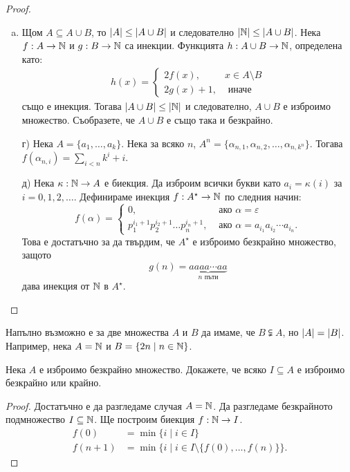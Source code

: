 \begin{proof}
  \begin{enumerate}[a)]
  \item
    Щом $A \subseteq A\cup B$, то $\lvert{A}\rvert \leq \lvert{A\cup B}\rvert$ и следователно
    $\lvert{\mathbb{N}}\rvert \leq \lvert{A\cup B}\rvert$.
    Нека $f:A\to \mathbb{N}$ и $g:B\to\mathbb{N}$ са инекции.
    Функцията $h:A\cup B\to \mathbb{N}$, определена като:
    \begin{align*}
      h(x) = 
      \begin{cases}
        2f(x), & x \in A\setminus B\\
        2g(x) + 1, & \mbox{ иначе}
      \end{cases}
    \end{align*}
    също е инекция.
    Тогава $\lvert{A\cup B}\rvert \leq \lvert{\mathbb{N}}\rvert$ и следователно, 
    $A\cup B$ е изброимо множество. 
    Съобразете, че $A\cup B$ е също така и безкрайно.
  \item[г)]
    Нека $A = \{a_1,\dots,a_k\}$.
    Нека за всяко $n$, $A^n = \{\alpha_{n,1},\alpha_{n,2},\dots, \alpha_{n,{k^n}}\}$.
    Тогава $f(\alpha_{n,i}) = \sum_{i<n} k^i + i$.
  \item[д)]
    Нека $\kappa:\mathbb{N} \to A$ е биекция.
    Да изброим всички букви като $a_i = \kappa(i)$ за $i = 0,1,2,\dots$.
    Дефинираме инекция $f:A^\star \to \mathbb{N}$ по следния начин:
    \[
    f(\alpha) = 
    \begin{cases}
      0,                             & \text{ ако } \alpha = \varepsilon\\
      p^{i_1+1}_1p^{i_2+1}_2\dots p^{i_n+1}_n, & \text{ ако } \alpha = a_{i_1}a_{i_2}\cdots a_{i_n}.
    \end{cases}
    \]
    Това е достатъчно за да твърдим, че $A^\star$ е изброимо безкрайно множество,
    защото \[g(n) = \underbrace{aaaa\cdots aa}_{n\text{ пъти}}\]
    дава инекция от $\mathbb{N}$ в $A^\star$.
  \end{enumerate}
\end{proof}

\begin{remark}
  Напълно възможно е за две множества $A$ и $B$ да имаме, че  $B \subsetneqq A$, но $\lvert{A}\rvert = \lvert{B}\rvert$.
  Например, нека $A = \mathbb{N}$ и $B = \{2n\mid n\in\mathbb{N}\}$.
\end{remark}

\begin{problem}
  Нека $A$ е изброимо безкрайно множество.
  Докажете, че всяко $I \subseteq A$ е изброимо безкрайно или крайно.
\end{problem}
\begin{proof}
  Достатъчно е да разгледаме случая $A = \mathbb{N}$.
  Да разгледаме безкрайното подмножество $I \subseteq \mathbb{N}$.
  Ще построим биекция $f:\mathbb{N} \to I$.
  \begin{align*}
    f(0)   & = \min\{i \mid i \in I\}\\
    f(n+1) &= \min\{i \mid i \in I \setminus\{f(0),\dots,f(n)\}\}.
\end{align*}
\end{proof}

